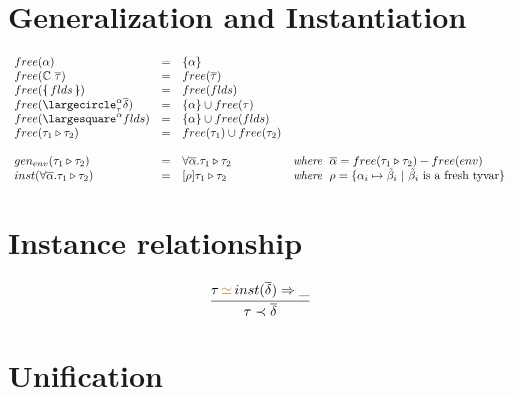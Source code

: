 \documentclass[11pt,a4paper]{article}
\newcommand{\record}[1]{\{\!\!\shortmid #1 \shortmid\!\!\}}
\newcommand{\overld}[3]{\largecircle^{#1}_{#2}{#3}}
\newcommand{\irecrd}[2]{\largesquare^{#1}{#2}}
\newcommand{\flexvar}[1]{\tilde#1}
\newcommand{\whereclause}[1]{\textit{where}\hspace{1.5ex}#1}
\newcommand{\unify}[3]{#1\,{\color{brown}{\simeq}}\,#2 \Rightarrow #3}
\newcommand{\braced}[1]{\{#1\}}
\newcommand{\tycon}{\mathbb{C}}
\newcommand{\type}{\tau}
\newcommand{\qualtype}[2]{#1 \triangleright #2}
\newcommand{\scheme}{\delta}
\begin{document}
\section {Generalization and Instantiation}
{\renewcommand{\arraystretch}{1.2}\[\begin{array}{lcll}
free(\alpha)                  & = & \braced{\alpha}                 &       \\
free({\tycon\ \ts})           & = & free(\ts)                 		&       \\
free(\record{flds})           & = & free(flds)                      &       \\
free({\overld{\alpha}{\type}{\s}}) & = & \braced{\alpha} \cup free(\type)    & \\
free({\irecrd{\alpha}{flds}}) & = & \braced{\alpha} \cup free(flds) &       \\
free(\qualtype{\type_1}{\type_2})
                              & = & free(\type_1) \cup free(\type_2)&       \\
& & \\
gen_{env}(\qualtype{\type_1}{\type_2})
                              & = & \forall \overline{\alpha}. \qualtype{\type_1}{\type_2}
                                                                    & \whereclause{\overline{\alpha} = free(\qualtype{\type_1}{\type_2}) - free(env)} \\
inst(\forall \overline{\alpha}.\qualtype{\type_1}{\type_2})
                              & = &[\rho]\qualtype{\type_1}{\type_2}& \whereclause{\rho = \braced{\alpha_i \mapsto \flexvar{\beta}_i \ |\ \flexvar{\beta}_i\ \textrm{is a fresh tyvar}}} \\
\end{array}\]}

\section{Instance relationship}
\vspace{-25pt}
\begin{flushright}
\framebox{ $\type \prec \scheme$}
\end{flushright}
\[
	\cfrac{ \unify{\type}{inst(\s)}{\_}}{\type \prec \s}
\]

\section{Unification}
\vspace{-25pt}
\begin{flushright}
\framebox{ $\unify{\type_1}{\type_2}{\rho}$}
\end{flushright}
\end{document}
